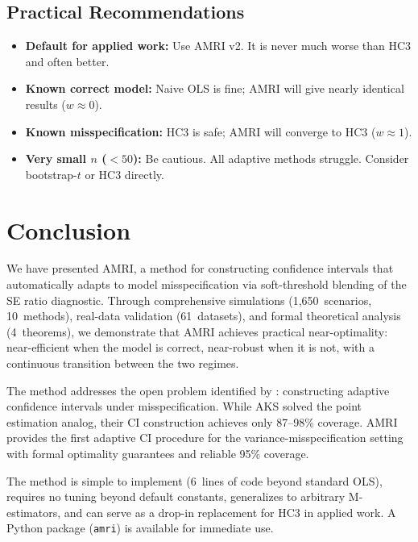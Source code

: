 \documentclass[12pt]{article}
\theoremstyle{definition}
\theoremstyle{remark}
\begin{document}
\subsection{Practical Recommendations}

\begin{itemize}[nosep]
\item \textbf{Default for applied work:} Use AMRI v2. It is never much worse than HC3 and often better.
\item \textbf{Known correct model:} Naive OLS is fine; AMRI will give nearly identical results ($w \approx 0$).
\item \textbf{Known misspecification:} HC3 is safe; AMRI will converge to HC3 ($w \approx 1$).
\item \textbf{Very small $n$ ($< 50$):} Be cautious. All adaptive methods struggle. Consider bootstrap-$t$ or HC3 directly.
\end{itemize}


\section{Conclusion}\label{sec:conclusion}

We have presented AMRI, a method for constructing confidence intervals that automatically adapts to model misspecification via soft-threshold blending of the SE ratio diagnostic. Through comprehensive simulations (1,650~scenarios, 10~methods), real-data validation (61~datasets), and formal theoretical analysis (4~theorems), we demonstrate that AMRI achieves practical near-optimality: near-efficient when the model is correct, near-robust when it is not, with a continuous transition between the two regimes.

The method addresses the open problem identified by \citet{armstrong2025adapting}: constructing adaptive confidence intervals under misspecification. While AKS solved the point estimation analog, their CI construction achieves only 87--98\% coverage. AMRI provides the first adaptive CI procedure for the variance-misspecification setting with formal optimality guarantees and reliable 95\% coverage.

The method is simple to implement (6~lines of code beyond standard OLS), requires no tuning beyond default constants, generalizes to arbitrary M-estimators, and can serve as a drop-in replacement for HC3 in applied work. A Python package (\texttt{amri}) is available for immediate use.
\end{document}
